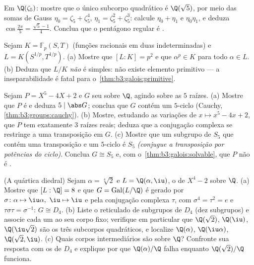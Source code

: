\begin{exercise}[$\star\star$]\label{exo:b3:galois:9}
Em $\Q(\zeta_5)$: mostre que o único subcorpo quadrático é $\Q(\sqrt5)$, por meio das
somas de Gauss $\eta_0 = \zeta_5 + \zeta_5^4$, $\eta_1 = \zeta_5^2 + \zeta_5^3$: calcule $\eta_0 + \eta_1$ e $\eta_0\eta_1$, e deduza $\cos\frac{2\pi}5 = \frac{\sqrt5 -
1}4$.
Conclua que o pentágono regular é .
\end{exercise}

\begin{exercise}[$\star\star\star$]\label{exo:b3:galois:10}
Sejam $K = \mathbb F_p(S, T)$ (funções racionais em duas indeterminadas) e $L = K(S^{1/p}, T^{1/p})$.
(a) Mostre que $[L:K] = p^2$ e que $\alpha^p \in K$ para todo $\alpha \in L$.
(b) Deduza que $L/K$ \emph{não} é simples: não existe elemento
primitivo --- a inseparabilidade é fatal para o~\cref{thm:b3:galois:primitive}.
\end{exercise}

\begin{exercise}[$\star\star\star$]\label{exo:b3:galois:11}
Sejam $P = X^5 - 4X + 2$ e $G$ seu  sobre $\Q$, agindo sobre
as $5$ raízes.
(a) Mostre que $P$ é  e deduza $5 \mid \abs G$; conclua que
$G$ contém um $5$-ciclo (Cauchy, \cref{thm:b3:groups:cauchy}).
(b) Mostre, estudando as variações de $x \mapsto x^5 - 4x +
2$, que $P$ tem exatamente
$3$ raízes reais; deduza que a conjugação complexa se restringe a
uma transposição em $G$.
(c) Mostre que um subgrupo de $S_5$ que contém uma transposição e
um $5$-ciclo é $S_5$ \emph{(conjugue a transposição por
potências do ciclo)}. Conclua $G \cong S_5$ e, com o~\cref{thm:b3:galois:solvable}, que
$P$ não é .
\end{exercise}

\begin{exercise}[$\star\star\star$]\label{exo:b3:galois:12}
(A quártica diedral) Sejam $\alpha = \sqrt[4]2$ e $L =
\Q(\alpha, \iu)$, o  de
$X^4 - 2$ sobre $\Q$.
(a) Mostre que $[L : \Q] = 8$ e que $G =
\operatorname{Gal}(L/\Q)$ é gerado por $\sigma\colon
\alpha \mapsto \iu\alpha,\ \iu \mapsto \iu$ e pela conjugação
complexa $\tau$, com $\sigma^4 = \tau^2 = e$ e $\tau\sigma\tau = \sigma^{-1}$: $G \cong D_4$.
(b) Liste o reticulado de subgrupos de $D_4$ (dez subgrupos) e
associe cada um ao seu corpo fixo; verifique em particular que $\Q(\sqrt2)$,
$\Q(\iu)$, $\Q(\iu\sqrt2)$ são os três subcorpos quadráticos, e localize $\Q(\alpha)$,
$\Q(\iu\alpha)$, $\Q(\sqrt2, \iu)$.
(c) Quais corpos intermediários são  sobre $\Q$? Confronte
sua resposta com os  de $D_4$ e explique por que
$\Q(\alpha)/\Q$ falha enquanto $\Q(\sqrt2)/\Q$ funciona.
\end{exercise}

